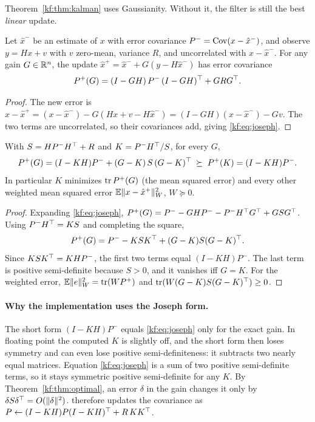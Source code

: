 Theorem~\ref{kf:thm:kalman} uses Gaussianity. Without it, the filter is still the
best \emph{linear} update.

\begin{proposition}\label{kf:prop:joseph}
Let $\hat x^-$ be an estimate of $x$ with error covariance
$P^-=\operatorname{Cov}(x-\hat x^-)$, and observe $y=Hx+v$ with $v$ zero-mean, variance $R$,
and uncorrelated with $x-\hat x^-$. For any gain $G\in\mathbb{R}^{n}$, the update
$\hat x^+=\hat x^-+G(y-H\hat x^-)$ has error covariance
\begin{equation}\label{kf:eq:joseph}
  P^+(G) = (I-GH)\,P^-\,(I-GH)^\top + G R G^\top .
\end{equation}
\end{proposition}
\begin{proof}
The new error is $x-\hat x^+ = (x-\hat x^-) - G(Hx+v-H\hat x^-) = (I-GH)(x-\hat x^-) - Gv$.
The two terms are uncorrelated, so their covariances add, giving \eqref{kf:eq:joseph}.
\end{proof}

\begin{theorem}\label{kf:thm:optimal}
With $S=HP^-H^\top+R$ and $K=P^-H^\top/S$, for every $G$,
\[
  P^+(G) = (I-KH)P^- + (G-K)\,S\,(G-K)^\top \;\succeq\; P^+(K) = (I-KH)P^- .
\]
In particular $K$ minimizes $\operatorname{tr} P^+(G)$ (the mean squared error) and every
other weighted mean squared error $\mathbb{E}\lVert x-\hat x^+\rVert_W^2$, $W\succeq0$.
\end{theorem}
\begin{proof}
Expanding \eqref{kf:eq:joseph},
$P^+(G)=P^- - GHP^- - P^-H^\top G^\top + G S G^\top$. Using $P^-H^\top=KS$ and
completing the square,
\[
  P^+(G) = P^- - KSK^\top + (G-K)S(G-K)^\top .
\]
Since $KSK^\top = KHP^-$, the first two terms equal $(I-KH)P^-$. The last term is positive
semi-definite because $S>0$, and it vanishes iff $G=K$. For the weighted error,
$\mathbb{E}\lVert e\rVert_W^2=\operatorname{tr}(WP^+)$ and $\operatorname{tr}(W(G-K)S(G-K)^\top)\ge0$.
\end{proof}

\paragraph{Why the implementation uses the Joseph form.}
The short form $(I-KH)P^-$ equals \eqref{kf:eq:joseph} only for the exact gain.
In floating point the computed $K$ is slightly off, and the short form then
loses symmetry and can even lose positive semi-definiteness: it subtracts two
nearly equal matrices. Equation \eqref{kf:eq:joseph} is a sum of two positive semi-definite
terms, so it stays symmetric positive semi-definite for any $K$. By
Theorem~\ref{kf:thm:optimal}, an error $\delta$ in the gain changes it only by
$\delta S\delta^\top=O(\lVert \delta\rVert^2)$.  therefore updates the
covariance as $P\gets(I-KH)P(I-KH)^\top+R\,KK^\top$.

